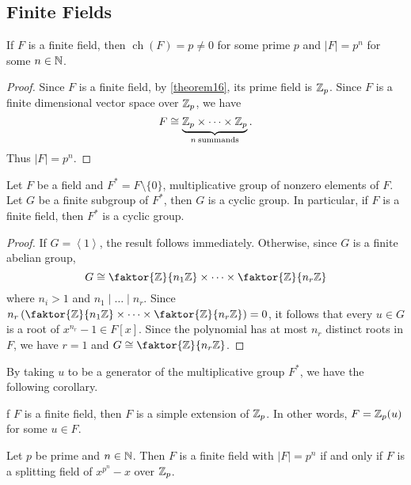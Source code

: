 \documentclass[11pt]{article}
\newcommand{\cyclic}[1]{\left\langle #1 \right\rangle}
\newcommand{\quotient}[2]{\faktor{#1}{#2}}
\DeclareMathOperator{\ch}{ch}
\begin{document}
\subsection{Finite Fields}
\begin{prop}
If $F$ is a finite field, then $\ch(F) = p \neq 0$ for some prime $p$ and $|F| =
p^n$ for some $n \in \mathbb{N}$. 
\end{prop}
\begin{proof}
Since $F$ is a finite field, by \cref{theorem16}, its prime field is $\mathbb{Z}_p$.
Since $F$ is a finite dimensional vector space over $\mathbb{Z}_p$, we have
\begin{equation*}
F \cong \underbrace{\mathbb{Z}_p \times \dots \times \mathbb{Z}_p}_{n\>\text{summands}}.
\end{equation*}
Thus $|F| = p^n$.
\end{proof}
\begin{theorem}
Let $F$ be a field and $F^* = F\setminus\{0\}$, multiplicative group of nonzero
elements of $F$. Let $G$ be a finite subgroup of $F^*$, then $G$ is a cyclic
group. In particular, if $F$ is a finite field, then $F^*$ is a cyclic group.
\label{theorem21}
\end{theorem}
\begin{proof}
If $G = \cyclic{1}$, the result follows immediately. Otherwise, since $G$ is a
finite abelian group,
\begin{equation*}
G \cong \quotient{\Z}{n_1\Z} \times \dots \times \quotient{\Z}{n_r\Z}
\end{equation*}
where $n_i > 1$ and $n_1 \mid \dots \mid n_r$. Since
$n_r\left(\quotient{\Z}{n_1\Z} \times \dots \times \quotient{\Z}{n_r\Z}\right) =
0$, it follows that every $u \in G$ is a root of $x^{n_r} - 1 \in F[x]$. Since
the polynomial has at most $n_r$ distinct roots in $F$, we have $r = 1$ and
$G \cong \quotient{\Z}{n_r\Z}$.
\end{proof}
By taking $u$ to be a generator of the multiplicative group $F^*$, we have the
following corollary.
\begin{corollary}
f $F$ is a finite field, then $F$ is a simple extension of $\mathbb{Z}_p$. In other
words, $F = \mathbb{Z}_p(u)$ for some $u \in F$.
\label{corollary23}
\end{corollary}
\begin{prop} \label{prop24}
Let $p$ be prime and $n \in \mathbb{N}$. Then $F$ is a finite field with $|F| = p^n$ if
and only if $F$ is a splitting field of $x^{p^n} - x$ over $\mathbb{Z}_p$.
\end{prop}
\end{document}
